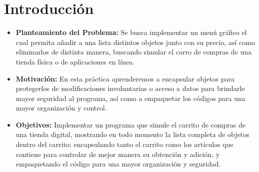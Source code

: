 \documentclass[letterpaper,12pt]{article}
\begin{document}
\tableofcontents
\clearpage

\section{Introducción}

\begin{itemize}
\item \textbf{Planteamiento del Problema:} Se busca implementar un menú gráfico el cual permita añadir a una lista distintos objetos junto con su precio, así como eliminarlos de distinta manera, buscando simular el carro de compras de una tienda física o de aplicaciones en línea.

\item \textbf{Motivación:} En esta práctica aprenderemos a encapsular objetos para protegerlos de modificaciones involuntarias o acceso a datos para brindarle mayor seguridad al programa, así como a empaquetar los códigos para una mayor organización y control.

\item \textbf{Objetivos:} Implementar un programa que simule el carrito de compras de una tienda digital, mostrando en todo momento la lista completa de objetos dentro del carrito; encapsulando tanto el carrito como los artículos que contiene para controlar de mejor manera su obtención y adición, y empaquetando el código para una mayor organización y seguridad.


\end{itemize}
\end{document}
